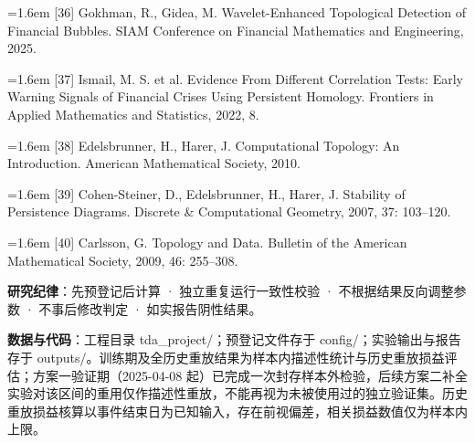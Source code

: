 \documentclass[12pt,a4paper]{ctexart}
\begin{document}
\noindent\hangindent=1.6em [36] Gokhman, R., Gidea, M. Wavelet-Enhanced Topological Detection of Financial Bubbles. SIAM Conference on Financial Mathematics and Engineering, 2025.\par
\noindent\hangindent=1.6em [37] Ismail, M. S. et al. Evidence From Different Correlation Tests: Early Warning Signals of Financial Crises Using Persistent Homology. Frontiers in Applied Mathematics and Statistics, 2022, 8.\par
\noindent\hangindent=1.6em [38] Edelsbrunner, H., Harer, J. Computational Topology: An Introduction. American Mathematical Society, 2010.\par
\noindent\hangindent=1.6em [39] Cohen-Steiner, D., Edelsbrunner, H., Harer, J. Stability of Persistence Diagrams. Discrete \& Computational Geometry, 2007, 37: 103–120.\par
\noindent\hangindent=1.6em [40] Carlsson, G. Topology and Data. Bulletin of the American Mathematical Society, 2009, 46: 255–308.\par
\textbf{研究纪律}：先预登记后计算 · 独立重复运行一致性校验 · 不根据结果反向调整参数 · 不事后修改判定 · 如实报告阴性结果。\par
\textbf{数据与代码}：工程目录 tda\_project/；预登记文件存于 config/；实验输出与报告存于 outputs/。训练期及全历史重放结果为样本内描述性统计与历史重放损益评估；方案一验证期（2025-04-08 起）已完成一次封存样本外检验，后续方案二补全实验对该区间的重用仅作描述性重放，不能再视为未被使用过的独立验证集。历史重放损益核算以事件结束日为已知输入，存在前视偏差，相关损益数值仅为样本内上限。\par
\end{document}
